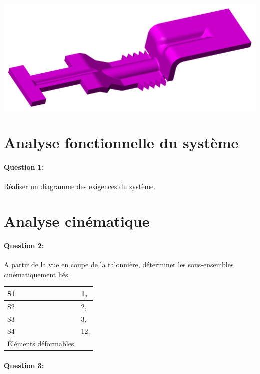 \begin{center}
\includegraphics[width=0.8\linewidth]{img/barrette_reglage.png}
\end{center}

\section{Analyse fonctionnelle du système}

\paragraph{Question 1:}

Réaliser un diagramme des exigences du système.

\section{Analyse cinématique}

\paragraph{Question 2:}

A partir de la vue en coupe de la talonnière, déterminer les sous-ensembles cinématiquement liés.

\begin{table}[!h]
 \centering\begin{tabular}{|m{5cm}|m{8cm}|}
 \hline
 S1 & 1, \\
 \hline
 S2 & 2, \\
 \hline
 S3 & 3, \\
 \hline
 S4 & 12, \\
 \hline
 Éléments déformables & \\
 \hline
 \end{tabular}
\end{table}

\paragraph{Question 3:}

